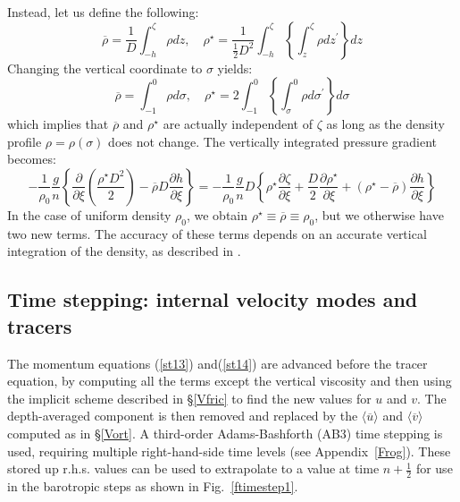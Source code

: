 Instead, let us define the following:
\begin{equation}
  \overline{\rho} = \frac{1}{D} \int_{-h}^\zeta \rho dz , \quad
  \rho^\star = \frac{1}{\frac{1}{2} D^2} \int_{-h}^\zeta
  \left\{ \int_z^\zeta \rho dz^{\prime} \right\} dz
\end{equation}
Changing the vertical coordinate to $\sigma$ yields:
\begin{equation}
  \overline{\rho} =  \int_{-1}^0 \rho d\sigma , \quad
  \rho^\star = 2 \int_{-1}^0
  \left\{ \int_\sigma^0 \rho d\sigma^{\prime} \right\} d\sigma
\end{equation}
which implies that $\overline{\rho}$ and $\rho^\star$ are actually
independent of $\zeta$ as long as the density profile $\rho =
\rho(\sigma)$ does not change. The vertically integrated pressure
gradient becomes:
\begin{equation}
   -\frac{1}{\rho_0} \frac{g}{n} \left\{ \frac{\partial}{\partial \xi}
   \left( \frac{\rho^\star D^2}{2} \right) - \overline{\rho} D
   \frac{\partial h}{\partial \xi} \right\} = -\frac{1}{\rho_0}
   \frac{g}{n} D \left\{ \rho^\star \frac{\partial \zeta}{\partial \xi} +
   \frac{D}{2} \frac{\partial \rho^\star}{\partial \xi} + (\rho^\star -
   \overline{\rho}) \frac{\partial h}{\partial \xi} \right\}
\end{equation}
In the case of uniform density $\rho_0$, we obtain $\rho^\star \equiv
\overline{\rho} \equiv \rho_0$, but we otherwise have two new terms.
The accuracy of these terms depends on an accurate vertical
integration of the density, as described in \citet{SS2005}.

\subsection{Time stepping: internal velocity modes and tracers}
The momentum equations (\ref{st13}) and(\ref{st14}) are advanced before
the tracer equation, by computing all the terms except the vertical
viscosity and then using the implicit scheme described in \S\ref{Vfric}
to find the new values for $u$ and $v$. The depth-averaged component
is then removed and replaced by the $\langle \overline{u} \rangle$
and $\langle \overline{v} \rangle$ computed as in \S\ref{Vort}.
A third-order Adams-Bashforth (AB3) time stepping is used, requiring
multiple right-hand-side time levels (see Appendix~\ref{Frog}). These
stored up r.h.s. values can be used to extrapolate to a value at
time $n+\frac{1}{2}$ for use in the barotropic steps as shown in
Fig.~\ref{ftimestep1}.

